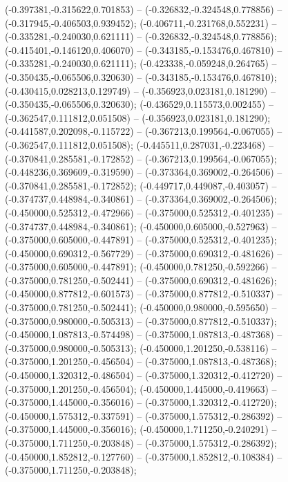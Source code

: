  (-0.397381,-0.315622,0.701853) -- (-0.326832,-0.324548,0.778856) -- (-0.317945,-0.406503,0.939452);
 (-0.406711,-0.231768,0.552231) -- (-0.335281,-0.240030,0.621111) -- (-0.326832,-0.324548,0.778856);
 (-0.415401,-0.146120,0.406070) -- (-0.343185,-0.153476,0.467810) -- (-0.335281,-0.240030,0.621111);
 (-0.423338,-0.059248,0.264765) -- (-0.350435,-0.065506,0.320630) -- (-0.343185,-0.153476,0.467810);
 (-0.430415,0.028213,0.129749) -- (-0.356923,0.023181,0.181290) -- (-0.350435,-0.065506,0.320630);
 (-0.436529,0.115573,0.002455) -- (-0.362547,0.111812,0.051508) -- (-0.356923,0.023181,0.181290);
 (-0.441587,0.202098,-0.115722) -- (-0.367213,0.199564,-0.067055) -- (-0.362547,0.111812,0.051508);
 (-0.445511,0.287031,-0.223468) -- (-0.370841,0.285581,-0.172852) -- (-0.367213,0.199564,-0.067055);
 (-0.448236,0.369609,-0.319590) -- (-0.373364,0.369002,-0.264506) -- (-0.370841,0.285581,-0.172852);
 (-0.449717,0.449087,-0.403057) -- (-0.374737,0.448984,-0.340861) -- (-0.373364,0.369002,-0.264506);
 (-0.450000,0.525312,-0.472966) -- (-0.375000,0.525312,-0.401235) -- (-0.374737,0.448984,-0.340861);
 (-0.450000,0.605000,-0.527963) -- (-0.375000,0.605000,-0.447891) -- (-0.375000,0.525312,-0.401235);
 (-0.450000,0.690312,-0.567729) -- (-0.375000,0.690312,-0.481626) -- (-0.375000,0.605000,-0.447891);
 (-0.450000,0.781250,-0.592266) -- (-0.375000,0.781250,-0.502441) -- (-0.375000,0.690312,-0.481626);
 (-0.450000,0.877812,-0.601573) -- (-0.375000,0.877812,-0.510337) -- (-0.375000,0.781250,-0.502441);
 (-0.450000,0.980000,-0.595650) -- (-0.375000,0.980000,-0.505313) -- (-0.375000,0.877812,-0.510337);
 (-0.450000,1.087813,-0.574498) -- (-0.375000,1.087813,-0.487368) -- (-0.375000,0.980000,-0.505313);
 (-0.450000,1.201250,-0.538116) -- (-0.375000,1.201250,-0.456504) -- (-0.375000,1.087813,-0.487368);
 (-0.450000,1.320312,-0.486504) -- (-0.375000,1.320312,-0.412720) -- (-0.375000,1.201250,-0.456504);
 (-0.450000,1.445000,-0.419663) -- (-0.375000,1.445000,-0.356016) -- (-0.375000,1.320312,-0.412720);
 (-0.450000,1.575312,-0.337591) -- (-0.375000,1.575312,-0.286392) -- (-0.375000,1.445000,-0.356016);
 (-0.450000,1.711250,-0.240291) -- (-0.375000,1.711250,-0.203848) -- (-0.375000,1.575312,-0.286392);
 (-0.450000,1.852812,-0.127760) -- (-0.375000,1.852812,-0.108384) -- (-0.375000,1.711250,-0.203848);
